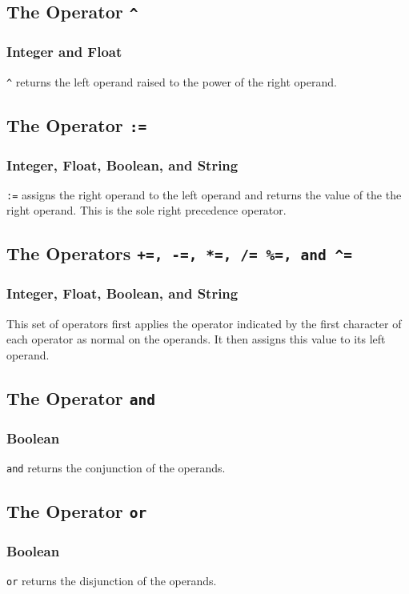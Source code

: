 \subsection{The Operator {\tt \textasciicircum}}
\subsubsection{Integer and Float}
\verb!^! returns the left operand raised to the power of the right operand.

\subsection{The Operator {\tt :=}}
\subsubsection{Integer, Float, Boolean, and String}
\verb!:=! assigns the right operand to the left operand and returns the value of the the right operand. This is the sole right precedence operator.

\subsection{The Operators {\tt +=, -=, *=, /= \%=, and \textasciicircum=}}
\subsubsection{Integer, Float, Boolean, and String}
This set of operators first applies the operator indicated by the first character of each operator as normal on the operands. It then assigns this value to its left operand.

\subsection{The Operator {\tt and}}
\subsubsection{Boolean}
\verb!and! returns the conjunction of the operands.

\subsection{The Operator {\tt or}}
\subsubsection{Boolean}
\verb!or! returns the disjunction of the operands.

